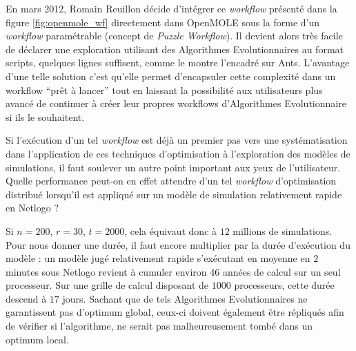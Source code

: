 En mars 2012, Romain Reuillon décide d'intégrer ce \textit{workflow} présenté dans la figure \ref{fig:openmole_wf} directement dans OpenMOLE sous la forme d'un \textit{workflow} paramétrable (concept de \textit{Puzzle Workflow}). Il devient alors très facile de déclarer une exploration utilisant des Algorithmes Evolutionnaires au format scripts, quelques lignes suffisent, comme le montre l'encadré sur Ants. L'avantage d'une telle solution c'est qu'elle permet d'encapsuler cette complexité dans un workflow \enquote{prêt à lancer} tout en laissant la possibilité aux utilisateurs plus avancé de continuer à créer leur propres workflows d'Algorithmes Evolutionnaire si ils le souhaitent.

Si l'exécution d'un tel \textit{workflow} est déjà un premier pas vers une systématisation dans l'application de ces techniques d'optimisation à l'exploration des modèles de simulations, il faut soulever un autre point important aux yeux de l'utilisateur. Quelle performance peut-on en effet attendre d'un tel \textit{workflow} d'optimisation distribué lorsqu'il est appliqué sur un modèle de simulation relativement rapide en Netlogo ?

Si $n=200$, $r = 30$, $t=2000$, cela équivaut donc à $12$ millions de simulations. Pour nous donner une durée, il faut encore multiplier par la durée d'exécution du modèle : un modèle jugé relativement rapide s'exécutant en moyenne en $2$ minutes sous Netlogo revient à cumuler environ $46$ années de calcul sur un seul processeur. Sur une grille de calcul disposant de $1000$ processeurs, cette durée descend à $17$ jours. Sachant que de tels Algorithmes Evolutionnaires ne garantissent pas d'optimum global, ceux-ci doivent également être répliqués afin de vérifier si l'algorithme, ne serait pas malheureusement tombé dans un optimum local.

